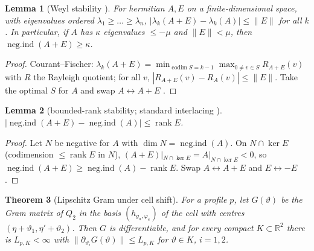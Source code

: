 \documentclass[11pt,reqno]{amsart}
\newtheorem{theorem}{Theorem}[section]
\newtheorem{lemma}[theorem]{Lemma}
\theoremstyle{definition}
\newcommand{\negind}{\operatorname{neg.ind}}
\newcommand{\rank}{\operatorname{rank}}
\newcommand{\R}{\mathbb{R}}
\begin{document}
\begin{lemma}[Weyl stability {\cite{Bhatia}}]\label{thm:weyl-stab}
For hermitian \(A,E\) on a finite-dimensional space, with eigenvalues ordered
\(\lambda_1\geq\dots\geq\lambda_n\), \(|\lambda_k(A+E)-\lambda_k(A)|\leq\|E\|\)
for all \(k\). In particular, if \(A\) has \(\kappa\) eigenvalues \(\leq-\mu\)
and \(\|E\|<\mu\), then \(\negind(A+E)\geq\kappa\).
\end{lemma}

\begin{proof}
Courant--Fischer: \(\lambda_k(A+E)=\min_{\operatorname{codim}S=k-1}
\max_{0\neq v\in S}R_{A+E}(v)\) with \(R\) the Rayleigh quotient; for all \(v\),
\(|R_{A+E}(v)-R_A(v)|\leq\|E\|\). Take the optimal \(S\) for \(A\) and swap
\(A\leftrightarrow A+E\) \cite{Bhatia}.
\end{proof}

\begin{lemma}[bounded-rank stability; standard interlacing {\cite{Bhatia}}]\label{thm:rank-stab}
\(|\negind(A+E)-\negind(A)|\leq\rank E\).
\end{lemma}

\begin{proof}
Let \(N\) be negative for \(A\) with \(\dim N=\negind(A)\). On
\(N\cap\ker E\) (codimension \(\leq\rank E\) in \(N\)),
\((A+E)|_{N\cap\ker E}=A|_{N\cap\ker E}<0\), so
\(\negind(A+E)\geq\negind(A)-\rank E\). Swap \(A\leftrightarrow A+E\) and
\(E\leftrightarrow-E\).
\end{proof}

\begin{theorem}[Lipschitz Gram under cell shift]\label{thm:lipschitz}
For a profile \(p\), let \(G(\vartheta)\) be the Gram matrix of \(Q_2\) in the
basis \((h_{g_a,\varphi_e})\) of the cell with centres
\((\eta+\vartheta_1,\eta'+\vartheta_2)\). Then \(G\) is differentiable, and for
every compact \(K\subset\R^2\) there is \(L_{p,K}<\infty\) with
\(\|\partial_{\vartheta_i}G(\vartheta)\|\leq L_{p,K}\) for
\(\vartheta\in K\), \(i=1,2\).
\end{theorem}
\end{document}
